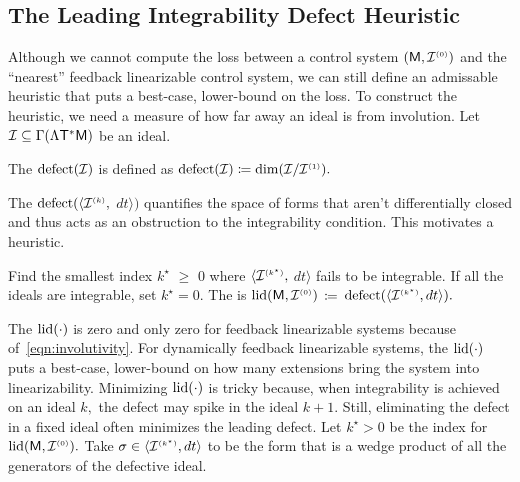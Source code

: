 \documentclass[a4paper]{ifacconf}
\begin{document}
\subsection{The Leading Integrability Defect Heuristic}
Although we cannot compute the loss between a control system \((\mathsf{M}, \mathcal{I}^{\smash{\scriptscriptstyle(0)}})\) and the ``nearest'' feedback linearizable control system, we can still define an admissable heuristic that puts a best-case, lower-bound on the loss.
To construct the heuristic, we need a measure of how far away an ideal is from involution. Let \(\mathcal{I} \subseteq \Gamma(\Lambda\mathsf{T}^*\mathsf{M})\) be an ideal.
%
\begin{defn}
  The  \(\operatorname{defect}(\mathcal{I})\) is defined as
  \(
    \operatorname{defect}(\mathcal{I})
      \coloneq 
        \operatorname{dim}(\mathcal{I} / \mathcal{I}^{\smash{\scriptscriptstyle(1)}}).
  \)
\end{defn}
%
The \(\operatorname{defect}(\langle\mathcal{I}^{\smash{\scriptscriptstyle(k)}},\) \(dt\rangle)\) quantifies the space of forms that aren't differentially closed and thus acts as an obstruction to the integrability condition.
This motivates a heuristic.
%
\begin{defn}
  Find the smallest index \(k^\star\) \(\geq\) \(0\) where \(\langle \mathcal{I}^{\smash{\scriptscriptstyle(k^\star)}},\) \(dt \rangle\) fails to be integrable.
  If all the ideals are integrable, set \(k^\star = 0.\)
  The  is
  \(
    \operatorname{lid}(\mathsf{M}, \mathcal{I}^{\smash{\scriptscriptstyle(0)}})
  \)
  \(\coloneq\)
  \(
    \operatorname{defect}(\langle \mathcal{I}^{\smash{\scriptscriptstyle(k^\star)}}, dt \rangle).
  \)
\end{defn}
%
The \(\operatorname{lid}(\cdot)\) is zero and only zero for feedback linearizable systems because of~\eqref{eqn:involutivity}.
For dynamically feedback linearizable systems, the \(\operatorname{lid}(\cdot)\) puts a best-case, lower-bound on how many extensions bring the system into linearizability.
%
Minimizing \(\operatorname{lid}(\cdot)\) is tricky because, when integrability is achieved on an ideal \(k,\) the defect may spike in the ideal \(k+1.\)
Still, eliminating the defect in a fixed ideal often minimizes the leading defect.
Let \(k^\star > 0\) be the index for \(\operatorname{lid}(\mathsf{M}, \mathcal{I}^{\smash{\scriptscriptstyle(0)}}).\) 
Take \(\sigma \in \langle \mathcal{I}^{\smash{\scriptscriptstyle(k^\star)}}, dt \rangle\) to be the form that is a wedge product of all the generators of the defective ideal.
\end{document}
